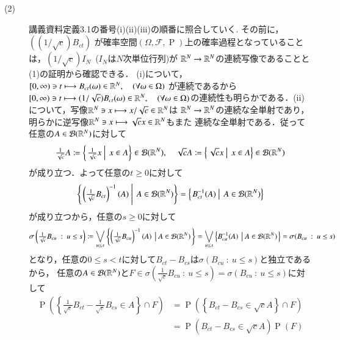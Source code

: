 \begin{prf}
\begin{description}
	\item[(2)] 講義資料定義3.1の番号(i)(ii)(iii)の順番に照合していく. その前に，$((1/\sqrt{c})B_{ct})$
		が確率空間$(\Omega, \mathcal{F}, \operatorname{P})$上の確率過程となっていることは，$(1/\sqrt{c})I_N$\ ($I_N$は$N$次単位行列)が
		$\mathbb{R}^N \rightarrow \mathbb{R}^N$の連続写像であることと(1)の証明から確認できる．
		(i)について，$[0,\infty) \ni t \longmapsto B_{ct}(\omega) \in \mathbb{R}^N, \quad(\forall \omega \in \Omega)$
		が連続であるから$[0,\infty) \ni t \longmapsto (1/\sqrt{c}) B_{ct}(\omega) \in \mathbb{R}^N, \quad(\forall \omega \in \Omega)$の連続性も明らかである．(ii)について，写像$\mathbb{R}^N \ni x \longmapsto x/\sqrt{c} \in \mathbb{R}^N$は
		$\mathbb{R}^N \rightarrow \mathbb{R}^N$の連続な全単射であり，明らかに逆写像$\mathbb{R}^N \ni x \longmapsto \sqrt{c}x \in \mathbb{R}^N$もまた
		連続な全単射である．従って任意の$A \in \mathcal{B}(\mathbb{R}^N)$に対して
		\begin{align}
			\tfrac{1}{\sqrt{c}} A \coloneqq \left\{\left. \tfrac{1}{\sqrt{c}}x\ \right|\ x \in A \right\} \in \mathcal{B}(\mathbb{R}^N), \quad
			\sqrt{c} A \coloneqq \left\{\left. \sqrt{c}x\ \right|\ x \in A \right\} \in \mathcal{B}(\mathbb{R}^N)
		\end{align}
		が成り立つ．よって任意の$t \geq 0$に対して
		\begin{align}
			\left\{\left. \left(\tfrac{1}{\sqrt{c}}B_{ct}\right)^{-1}(A)\ \right|\ A \in \mathcal{B}(\mathbb{R}^N) \right\}
			= \left\{\left. B_{ct}^{-1}(A)\ \right|\ A \in \mathcal{B}(\mathbb{R}^N) \right\}
		\end{align}
		が成り立つから，任意の$s \geq 0$に対して
		\begin{align}
			\sigma\left(\tfrac{1}{\sqrt{c}}B_{cu}\ :\ u \leq s\right)
			\coloneqq \bigvee_{u \leq s} \left\{ \left(\tfrac{1}{\sqrt{c}}B_{cu}\right)^{-1}(A)\ \left|\ A \in \mathcal{B}(\mathbb{R}^N) \right.\right\}
			= \bigvee_{u \leq s} \left\{ B_{cu}^{-1}(A)\ \left|\ A \in \mathcal{B}(\mathbb{R}^N) \right.\right\}
			= \sigma(B_{cu}\ :\ u \leq s)
		\end{align}
		となり，任意の$0 \leq s < t$に対して$B_{ct} - B_{cs}$は$\sigma(B_{cu}\ :\ u \leq s)$と独立であるから，
		任意の$A \in \mathcal{B}(\mathbb{R}^N)$と$F \in \sigma\left(\tfrac{1}{\sqrt{c}}B_{cu}\ :\ u \leq s\right) = \sigma(B_{cu}\ :\ u \leq s)$に対して
		\begin{align}
			\operatorname{P}\left( \left\{ \tfrac{1}{\sqrt{c}}B_{ct} - \tfrac{1}{\sqrt{c}}B_{cs} \in A \right\} \cap F \right)
			&= \operatorname{P}\left( \left\{ B_{ct} - B_{cs} \in \sqrt{c}A \right\} \cap F \right) \\
			&= \operatorname{P}\left(B_{ct} - B_{cs} \in \sqrt{c}A \right)  \operatorname{P}(F) \\

\end{align}
\end{description}
\end{prf}
